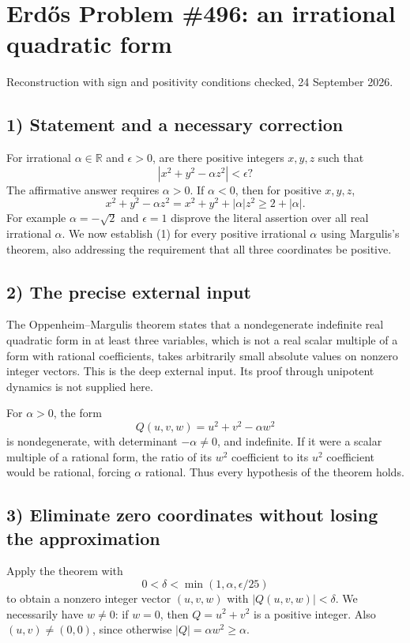 \section{Erd\H{o}s Problem \#496: an irrational quadratic form}
\noindent Reconstruction with sign and positivity conditions checked, 24 September 2026.

\subsection*{1) Statement and a necessary correction}
For irrational $\alpha\in\mathbb R$ and $\epsilon>0$, are there positive integers $x,y,z$ such that
\[|x^2+y^2-\alpha z^2|<\epsilon?\tag{1}\]
The affirmative answer requires $\alpha>0$. If $\alpha<0$, then for positive $x,y,z$,
\[x^2+y^2-\alpha z^2=x^2+y^2+|\alpha|z^2\ge2+|\alpha|.\]
For example $\alpha=-\sqrt2$ and $\epsilon=1$ disprove the literal assertion over all real irrational $\alpha$. We now establish (1) for every positive irrational $\alpha$ using Margulis's theorem, also addressing the requirement that all three coordinates be positive.

\subsection*{2) The precise external input}
The Oppenheim--Margulis theorem states that a nondegenerate indefinite real quadratic form in at least three variables, which is not a real scalar multiple of a form with rational coefficients, takes arbitrarily small absolute values on nonzero integer vectors. This is the deep external input. Its proof through unipotent dynamics is not supplied here.

For $\alpha>0$, the form
\[Q(u,v,w)=u^2+v^2-\alpha w^2
\]
is nondegenerate, with determinant $-\alpha\ne0$, and indefinite. If it were a scalar multiple of a rational form, the ratio of its $w^2$ coefficient to its $u^2$ coefficient would be rational, forcing $\alpha$ rational. Thus every hypothesis of the theorem holds.

\subsection*{3) Eliminate zero coordinates without losing the approximation}
Apply the theorem with
\[0<\delta<\min(1,\alpha,\epsilon/25)
\]
to obtain a nonzero integer vector $(u,v,w)$ with $|Q(u,v,w)|<\delta$. We necessarily have $w\ne0$: if $w=0$, then $Q=u^2+v^2$ is a positive integer. Also $(u,v)\ne(0,0)$, since otherwise $|Q|=\alpha w^2\ge\alpha$.

